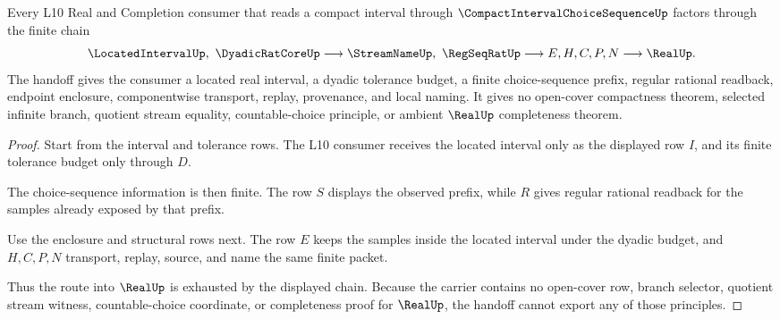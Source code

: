 \begin{theorem}
\label{thm:compact-interval-choice-sequence-l10-handoff}
Every L10 Real and Completion consumer that reads a compact interval through $\CompactIntervalChoiceSequenceUp$ factors through the finite chain
$$
\LocatedIntervalUp,\ \DyadicRatCoreUp
\longrightarrow
\StreamNameUp,\ \RegSeqRatUp
\longrightarrow
E,H,C,P,N
\longrightarrow
\RealUp .
$$
The handoff gives the consumer a located real interval, a dyadic tolerance budget, a finite choice-sequence prefix, regular rational readback, endpoint enclosure, componentwise transport, replay, provenance, and local naming. It gives no open-cover compactness theorem, selected infinite branch, quotient stream equality, countable-choice principle, or ambient $\RealUp$ completeness theorem.
\end{theorem}
\begin{proof}
Start from the interval and tolerance rows. The L10 consumer receives the located interval only as the displayed row $I$, and its finite tolerance budget only through $D$.

The choice-sequence information is then finite. The row $S$ displays the observed prefix, while $R$ gives regular rational readback for the samples already exposed by that prefix.

Use the enclosure and structural rows next. The row $E$ keeps the samples inside the located interval under the dyadic budget, and $H,C,P,N$ transport, replay, source, and name the same finite packet.

Thus the route into $\RealUp$ is exhausted by the displayed chain. Because the carrier contains no open-cover row, branch selector, quotient stream witness, countable-choice coordinate, or completeness proof for $\RealUp$, the handoff cannot export any of those principles.
\end{proof}



